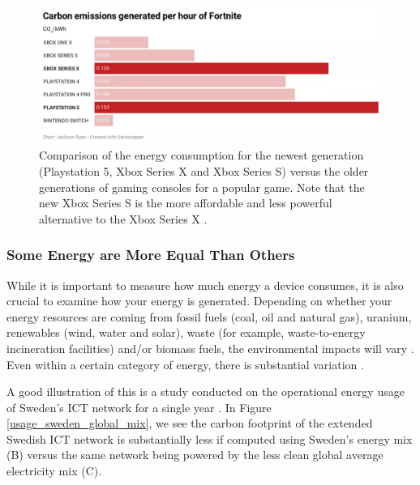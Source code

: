 \documentclass{article}
\begin{document}
\begin{figure}[h]
    \includegraphics[width=.9 \textwidth]{./images/usage_gaming_consoles.png}
    \centering
    \caption{Comparison of the energy consumption for the newest generation (Playstation 5, Xbox Series X and Xbox Series S) versus the older generations of gaming consoles for a popular game. Note that the new Xbox Series S is the more affordable and less powerful alternative to the Xbox Series X \cite{cnet2020gamingconsoles}.}
    \label{usage_gaming_consoles}
\end{figure}

\subsubsection{Some Energy are More Equal Than Others}
While it is important to measure how much energy a device consumes, it is also crucial to examine how your energy is generated. Depending on whether your energy resources are coming from fossil fuels (coal, oil and natural gas), uranium, renewables (wind, water and solar), waste (for example, waste-to-energy incineration facilities) and/or biomass fuels, the environmental impacts will vary \cite{dincer2000renewable}. Even within a certain category of energy, there is substantial variation \cite{boyle2004renewable}.

A good illustration of this is a study conducted on the operational energy usage of Sweden's ICT network for a single year \cite{malmodin2014life}. In Figure \ref{usage_sweden_global_mix}, we see the carbon footprint of the extended Swedish ICT network is substantially less if computed using Sweden's energy mix (B) versus the same network being powered by the less clean global average electricity mix (C).
\end{document}
